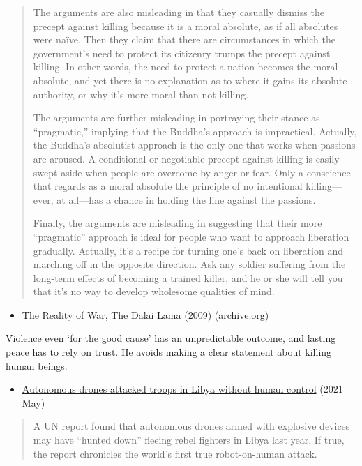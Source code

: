 \begin{quote}
The arguments are also misleading in that they casually dismiss the
precept against killing because it is a moral absolute, as if all
absolutes were naïve. Then they claim that there are circumstances in
which the government's need to protect its citizenry trumps the precept
against killing. In other words, the need to protect a nation becomes
the moral absolute, and yet there is no explanation as to where it gains
its absolute authority, or why it's more moral than not killing.

The arguments are further misleading in portraying their stance as
``pragmatic,'' implying that the Buddha's approach is impractical.
Actually, the Buddha's absolutist approach is the only one that works
when passions are aroused. A conditional or negotiable precept against
killing is easily swept aside when people are overcome by anger or fear.
Only a conscience that regards as a moral absolute the principle of no
intentional killing---ever, at all---has a chance in holding the line
against the passions.

Finally, the arguments are misleading in suggesting that their more
``pragmatic'' approach is ideal for people who want to approach
liberation gradually. Actually, it's a recipe for turning one's back on
liberation and marching off in the opposite direction. Ask any soldier
suffering from the long-term effects of becoming a trained killer, and
he or she will tell you that it's no way to develop wholesome qualities
of mind.
\end{quote}

\begin{itemize}
\tightlist
\item
  \href{https://www.dalailama.com/messages/world-peace/the-reality-of-war}{The
  Reality of War}, The Dalai Lama (2009)
  (\href{https://web.archive.org/web/20210526055246/https://www.dalailama.com/messages/world-peace/the-reality-of-war}{archive.org})
\end{itemize}

Violence even `for the good cause' has an unpredictable outcome, and
lasting peace has to rely on trust. He avoids making a clear statement
about killing human beings.

\begin{itemize}
\tightlist
\item
  \href{https://www.rt.com/news/525111-libya-killer-drone-attack/}{Autonomous
  drones attacked troops in Libya without human control} (2021 May)
\end{itemize}

\begin{quote}
A UN report found that autonomous drones armed with explosive devices
may have ``hunted down'' fleeing rebel fighters in Libya last year. If
true, the report chronicles the world's first true robot-on-human
attack.
\end{quote}

